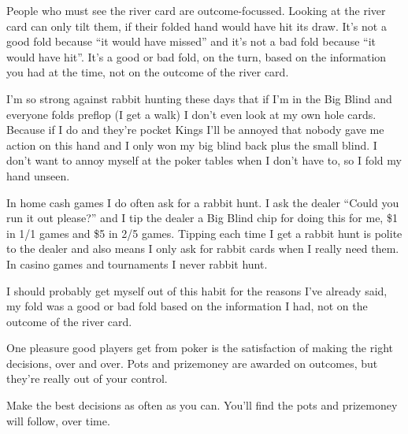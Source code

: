 People who must see the river card are outcome-focussed. Looking
at the river card can only tilt them, if their folded hand would
have hit its draw. It's not a good fold because ``it would have
missed'' and it's not a bad fold because ``it would have hit''. It's
a good or bad fold, on the turn, based on the information you
had at the time, not on the outcome of the river card.

I'm so strong against rabbit hunting these days that if I'm in the
Big Blind and everyone folds preflop (I get a walk) I don't even look
at my own hole cards. Because if I do and they're pocket Kings I'll be
annoyed that nobody gave me action on this hand and I only won my big
blind back plus the small blind. I don't want to annoy myself at the
poker tables when I don't have to, so I fold my hand unseen.

In home cash games I do often ask for a rabbit hunt. I ask the
dealer ``Could you run it out please?'' and I tip the dealer a Big
Blind chip for doing this for me, \$1 in 1/1 games and \$5 in 2/5
games. Tipping each time I get a rabbit hunt is polite to the dealer
and also means I only ask for rabbit cards when I really need them. In
casino games and tournaments I never rabbit hunt.

I should probably get myself out of this habit for the reasons I've
already said, my fold was a good or bad fold based on the information
I had, not on the outcome of the river card.

One pleasure good players get from poker is the satisfaction
of making the right decisions, over and over. Pots and prizemoney
are awarded on outcomes, but they're really out of your control.

Make the best decisions as often as you can. You'll find the pots
and prizemoney will follow, over time.
